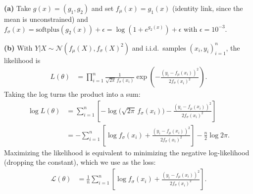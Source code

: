 \documentclass{article}
\begin{document}
\begin{solution}[]
  \textbf{(a)} Take $g(x)=(g_1,g_2)$ and set $f_\mu(x)=g_1(x)$ (identity link, since the mean is unconstrained) and $f_\sigma(x)=\mathrm{softplus}(g_2(x))+\epsilon=\log(1+e^{g_2(x)})+\epsilon$ with $\epsilon=10^{-3}$.

  \textbf{(b)} With $Y|X\sim\mathcal N(f_\mu(X),f_\sigma(X)^2)$ and i.i.d.\ samples $(x_i,y_i)_{i=1}^n$, the likelihood is
  \begin{align*}
    L(\theta) &= \prod_{i=1}^n \frac{1}{\sqrt{2\pi}\,f_\sigma(x_i)}\exp\!\left(-\frac{(y_i-f_\mu(x_i))^2}{2f_\sigma(x_i)^2}\right).
  \end{align*}
  Taking the log turns the product into a sum:
  \begin{align*}
    \log L(\theta) &= \sum_{i=1}^n \left[-\log\!\big(\sqrt{2\pi}\,f_\sigma(x_i)\big) - \frac{(y_i-f_\mu(x_i))^2}{2f_\sigma(x_i)^2}\right] \\
    &= -\sum_{i=1}^n \left[\log f_\sigma(x_i) + \frac{(y_i-f_\mu(x_i))^2}{2f_\sigma(x_i)^2}\right] - \frac n2\log 2\pi .
  \end{align*}
  Maximizing the likelihood is equivalent to minimizing the negative log-likelihood (dropping the constant), which we use as the loss:
  \begin{align*}
    \mathcal L(\theta) &= \frac1n\sum_{i=1}^n\left[\log f_\sigma(x_i)+\frac{(y_i-f_\mu(x_i))^2}{2f_\sigma(x_i)^2}\right].
  \end{align*}


\end{solution}
\end{document}
